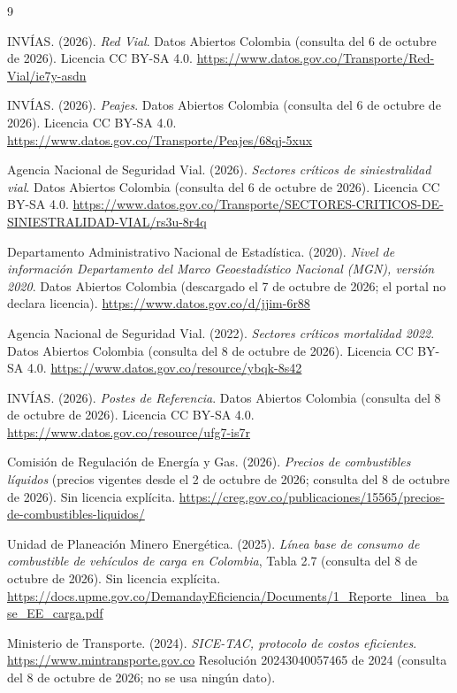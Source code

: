 \documentclass[12pt,a4paper]{article}
\begin{document}
\begin{thebibliography}{9}

INVÍAS. (2026). \textit{Red Vial}. Datos Abiertos Colombia (consulta del 6 de octubre de 2026). Licencia CC BY-SA 4.0.
\url{https://www.datos.gov.co/Transporte/Red-Vial/ie7y-asdn}

INVÍAS. (2026). \textit{Peajes}. Datos Abiertos Colombia (consulta del 6 de octubre de 2026). Licencia CC BY-SA 4.0.
\url{https://www.datos.gov.co/Transporte/Peajes/68qj-5xux}

Agencia Nacional de Seguridad Vial. (2026). \textit{Sectores críticos de
siniestralidad vial}. Datos Abiertos Colombia (consulta del 6 de octubre de 2026). Licencia CC BY-SA 4.0.
\url{https://www.datos.gov.co/Transporte/SECTORES-CRITICOS-DE-SINIESTRALIDAD-VIAL/rs3u-8r4q}

Departamento Administrativo Nacional de Estadística. (2020).
\textit{Nivel de información Departamento del Marco Geoestadístico Nacional
(MGN), versión 2020}. Datos Abiertos Colombia (descargado el 7 de octubre de
2026; el portal no declara licencia). \url{https://www.datos.gov.co/d/jjim-6r88}

Agencia Nacional de Seguridad Vial. (2022). \textit{Sectores críticos
mortalidad 2022}. Datos Abiertos Colombia (consulta del 8 de octubre de 2026).
Licencia CC BY-SA 4.0. \url{https://www.datos.gov.co/resource/ybqk-8s42}

INVÍAS. (2026). \textit{Postes de Referencia}. Datos Abiertos Colombia
(consulta del 8 de octubre de 2026). Licencia CC BY-SA 4.0.
\url{https://www.datos.gov.co/resource/ufg7-is7r}

Comisión de Regulación de Energía y Gas. (2026). \textit{Precios de
combustibles líquidos} (precios vigentes desde el 2 de octubre de 2026;
consulta del 8 de octubre de 2026). Sin licencia explícita.
\url{https://creg.gov.co/publicaciones/15565/precios-de-combustibles-liquidos/}

Unidad de Planeación Minero Energética. (2025). \textit{Línea base de consumo
de combustible de vehículos de carga en Colombia}, Tabla 2.7 (consulta del 8
de octubre de 2026). Sin licencia explícita.
\url{https://docs.upme.gov.co/DemandayEficiencia/Documents/1_Reporte_linea_base_EE_carga.pdf}

Ministerio de Transporte. (2024). \textit{SICE-TAC, protocolo de costos
eficientes}. \url{https://www.mintransporte.gov.co} Resolución
20243040057465 de 2024 (consulta del 8 de octubre de 2026; no se usa ningún
dato).

\end{thebibliography}
\end{document}
